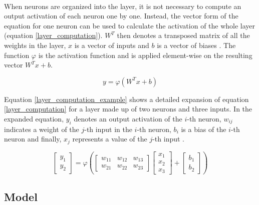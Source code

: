 \paragraph{}
When neurons are organized into the layer, it is not necessary to compute an output activation of each neuron one by one. Instead, the vector form of the equation for one neuron can be used to calculate the activation of the whole layer (equation \ref{layer_computation}). $W^T$ then denotes a transposed matrix of all the weights in the layer, $x$ is a vector of inputs and $b$ is a vector of biases \cite{Nielsen}. The function $\varphi$ is the activation function and is applied element-wise on the resulting vector $W^T x + b$. 

\begin{equation}
y = \varphi(W^T x + b)
\label{layer_computation}
\end{equation}  

Equation \ref{layer_computation_example} shows a detailed expansion of equation \ref{layer_computation} for a layer made up of two neurons and three inputs. In the expanded equation, $y_i$ denotes an output activation of the $i$-th neuron, $w_{ij}$ indicates a weight of the $j$-th input in the $i$-th neuron, $b_i$ is a bias of the $i$-th neuron and finally, $x_j$ represents a value of the $j$-th input \cite{Nielsen}. 

\begin{equation}
\begin{bmatrix}
y_1 \\
y_2
\end{bmatrix} =
\varphi(
\begin{bmatrix}
w_{11} & w_{12} & w_{13}\\
w_{21} & w_{22} & w_{23}
\end{bmatrix}
\begin{bmatrix}
x_1 \\
x_2 \\
x_3
\end{bmatrix} + 
\begin{bmatrix}
b_1 \\
b_2
\end{bmatrix}
)
\label{layer_computation_example}
\end{equation}  

\subsection{Model}
